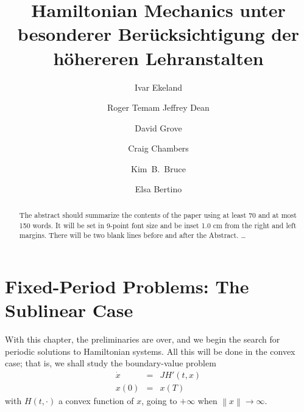 \documentclass{svproc}
\begin{document}
\mainmatter              %
%
\title{Hamiltonian Mechanics unter besonderer Ber\"ucksichtigung der
h\"ohereren Lehranstalten}
%
%
\author{Ivar Ekeland \and Roger Temam
Jeffrey Dean \and David Grove \and Craig Chambers \and Kim~B.~Bruce \and
Elsa Bertino}
%
%
%

\maketitle              %

\begin{abstract}
The abstract should summarize the contents of the paper
using at least 70 and at most 150 words. It will be set in 9-point
font size and be inset 1.0 cm from the right and left margins.
There will be two blank lines before and after the Abstract. \dots
\end{abstract}
%
\section{Fixed-Period Problems: The Sublinear Case}
%
With this chapter, the preliminaries are over, and we begin the search
for periodic solutions to Hamiltonian systems. All this will be done in
the convex case; that is, we shall study the boundary-value problem
\begin{eqnarray*}
  \dot{x}&=&JH' (t,x)\\
  x(0) &=& x(T)
\end{eqnarray*}
with $H(t,\cdot)$ a convex function of $x$, going to $+\infty$ when
$\left\|x\right\| \to \infty$.
\end{document}
